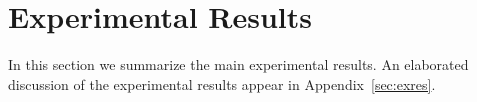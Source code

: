 \documentclass[11pt]{article}
\newenvironment{proof sketch}[1]{\noindent {\emph{Proof sketch of #1:}}}{\hfill \qed}
\newcommand{\SINR}{\text{\sc{sinr}}}
\newcommand{\MCS}{\text{\sc{mcs}}}
\begin{document}
\section{Experimental Results}
In this section we summarize the main experimental results.  An
elaborated discussion of the experimental results appear in
Appendix~\ref{sec:exres}.

\end{document}

